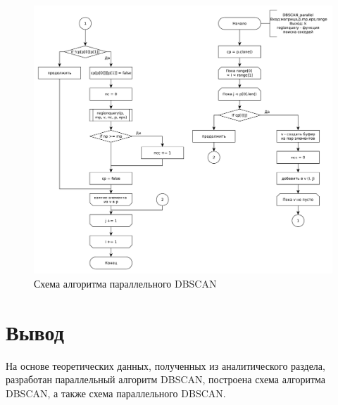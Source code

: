 \begin{figure}[ht!]
	\centering
	\includegraphics[width=1\linewidth]{assets/graphs/dbscan_p.pdf}
	\caption{Схема алгоритма параллельного DBSCAN}
	\label{fig:alg-p}
\end{figure}



\section*{Вывод}

На основе теоретических данных, полученных из аналитического раздела, разработан параллельный алгоритм DBSCAN, построена схема алгоритма DBSCAN, а также схема параллельного DBSCAN.